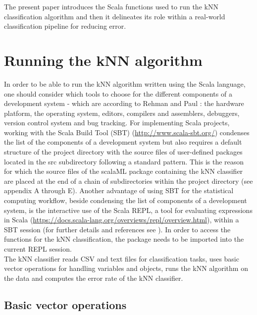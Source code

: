 \documentclass[twoside, 11p]{article}
\begin{document}
      
The present paper introduces the Scala functions used to run the kNN classification algorithm and then it delineates its role within a real-world classification pipeline for reducing error.    
 
\section{Running the kNN algorithm}

In order to be able to run the kNN algorithm written using the Scala language, one should consider which tools to choose for the different components of a development system -  which are according to Rehman and Paul \cite{rehman_linux_2003}: the hardware platform, the operating system, editors, compilers and assemblers, debuggers, version control system and bug tracking.
For implementing Scala projects, working with the Scala Build Tool (SBT) (\href{http://www.scala-sbt.org/}{http://www.scala-sbt.org/}) condenses the list of the components of a development system but also requires a default structure of the project directory with the source files of user-defined packages located in the src subdirectory \cite{suereth_sbt_2016} following a standard pattern. This is the reason for which the source files of the scalaML package containing the kNN classifier are placed at the end of a chain of subdirectories within the project directory (see appendix A through E). 
Another advantage of using SBT for the statistical computing workflow, beside condensing the list of components of a development system, is the interactive use of the Scala REPL, a tool for evaluating expressions in Scala (\href{https://docs.scala-lang.org/overviews/repl/overview.html}{https://docs.scala-lang.org/overviews/repl/overview.html}), within a SBT session (for further details and references see \cite{tesileanu_using_2017}).
In order to access the functions for the kNN classification, the package needs to be imported into the current REPL session.\\


The kNN classifier reads CSV and text files for classification tasks, uses basic vector operations for handling variables and objects, runs the kNN algorithm on the data and computes the error rate of the kNN classifier.

\subsection{Basic vector operations}
\end{document}

